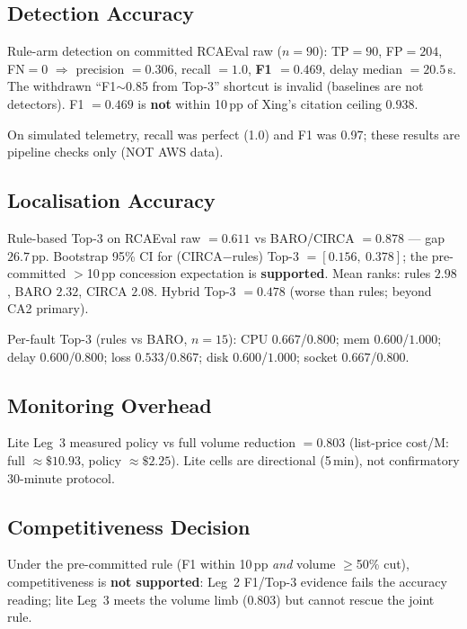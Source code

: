 \subsection{Detection Accuracy}

Rule-arm detection on committed RCAEval raw ($n{=}90$): TP$=90$, FP$=204$, FN$=0$ $\Rightarrow$ precision $=0.306$, recall $=1.0$, \textbf{F1 $=0.469$}, delay median $=20.5$\,s. The withdrawn ``F1$\sim$0.85 from Top-3'' shortcut is invalid (baselines are not detectors). F1 $=0.469$ is \textbf{not} within 10\,pp of Xing's citation ceiling $0.938$.

On simulated telemetry, recall was perfect (1.0) and F1 was 0.97; these results are pipeline checks only (NOT AWS data).

\subsection{Localisation Accuracy}

Rule-based Top-3 on RCAEval raw $=0.611$ vs BARO/CIRCA $=0.878$ --- gap $26.7$\,pp. Bootstrap 95\% CI for (CIRCA$-$rules) Top-3 $=[0.156,\ 0.378]$; the pre-committed $>$10\,pp concession expectation is \textbf{supported}. Mean ranks: rules $2.98$, BARO $2.32$, CIRCA $2.08$. Hybrid Top-3 $=0.478$ (worse than rules; beyond CA2 primary).

Per-fault Top-3 (rules vs BARO, $n{=}15$): CPU $0.667$/$0.800$; mem $0.600$/$1.000$; delay $0.600$/$0.800$; loss $0.533$/$0.867$; disk $0.600$/$1.000$; socket $0.667$/$0.800$.

\subsection{Monitoring Overhead}

Lite Leg~3 measured policy vs full volume reduction $=0.803$ (list-price cost/M: full $\approx\$10.93$, policy $\approx\$2.25$). Lite cells are directional (5\,min), not confirmatory 30-minute protocol.

\subsection{Competitiveness Decision}

Under the pre-committed rule (F1 within 10\,pp \textit{and} volume $\geq$50\% cut), competitiveness is \textbf{not supported}: Leg~2 F1/Top-3 evidence fails the accuracy reading; lite Leg~3 meets the volume limb ($0.803$) but cannot rescue the joint rule.

